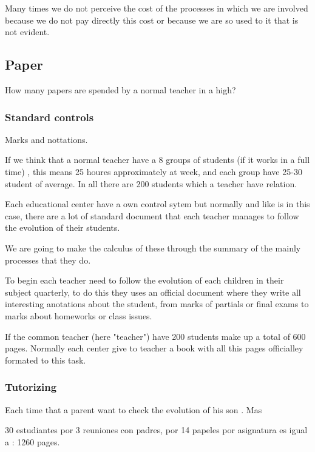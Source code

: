 Many times we do not perceive the cost of the processes in which we are involved
because we do not pay directly this cost or because we are so used to it that is
not evident.

\subsection{Paper}

How many papers are spended by a normal teacher in a high?


\subsubsection{Standard controls}

Marks and nottations.

If we think that a normal teacher have a 8 groups of students (if it works in a
full time) ,  this means 25 houres approximately at week, and each group have
25-30 student of average. In all there are 200 students which a teacher have relation.

Each educational center have a own control sytem but normally and like is in this
case, there are a lot of standard document that each teacher manages to follow
the evolution of their students.

We are going to make the calculus of  these through the summary of the mainly
processes that they do.

To begin each teacher need to follow the evolution of each children in their
subject quarterly, to do this they uses an official document where they write
all interesting anotations about the student, from marks of partials or final
exams to marks about homeworks or class issues.

If the common teacher (here "teacher") have 200 students make up a total of 600
pages. Normally each center give to teacher a book with all this pages officialley
formated to this task.





\subsubsection{Tutorizing}

Each time that a parent want to check the evolution of his son  . Mas

30 estudiantes por 3 reuniones con padres, por 14 papeles por
asignatura es igual a : 1260 pages.



